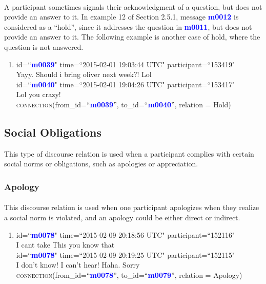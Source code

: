 \documentclass{article}
\begin{document}
\paragraph{}
A participant sometimes signals their acknowledgment of a question, but does not provide an answer to it. In example 12 of Section 2.5.1, message \textbf{\textcolor{blue}{m0012}} is considered as a ``hold'', since it addresses the question in \textbf{\textcolor{blue}{m0011}}, but does not provide an answer to it. The following example is another case of hold, where the question is not answered.

\begin{enumerate}[resume]
\item id=``\textbf{\textcolor{blue}{m0039}}" time=``2015-02-01 19:03:44 UTC" participant=``153419"\\
Yayy. Should i bring oliver next week?! Lol\\
id=``\textbf{\textcolor{blue}{m0040}}" time=``2015-02-01 19:04:26 UTC" participant=``153417"\\
Lol you crazy!\\
\textsc{connection}(from\_id=``\textbf{\textcolor{blue}{m0039}}'', to\_id=``\textbf{\textcolor{blue}{m0040}}'', relation = Hold)\\
\end{enumerate}

\subsection{Social Obligations}
This type of discourse relation is used when a participant complies with certain social norms or obligations, such as apologies or appreciation. 

\subsubsection{Apology}
\paragraph{}
This discourse relation is used when one participant apologizes when they realize a social norm is violated, and an apology could be either direct or indirect. 
\begin{enumerate}[resume]
\item id=``\textbf{\textcolor{blue}{m0078}}" time=``2015-02-09 20:18:56 UTC" participant=``152116"\\
I cant take This you know that\\
id=``\textbf{\textcolor{blue}{m0078}}" time=``2015-02-09 20:19:25 UTC" participant=``152115"\\
I don't know! I can't hear! Haha. Sorry\\
\textsc{connection}(from\_id=``\textbf{\textcolor{blue}{m0078}}'', to\_id=``\textbf{\textcolor{blue}{m0079}}'', relation = Apology)\\
\end{enumerate}
\end{document}
